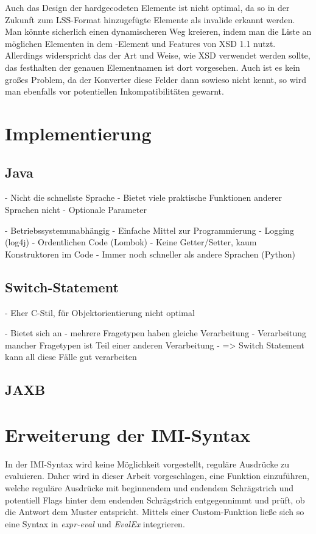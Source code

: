 Auch das Design der hardgecodeten Elemente ist nicht optimal, da so in der Zukunft zum LSS-Format hinzugefügte Elemente als invalide erkannt werden.
Man könnte sicherlich einen dynamischeren Weg kreieren, indem man die Liste an möglichen Elementen in dem -Element und Features von XSD 1.1 nutzt.
Allerdings widerspricht das der Art und Weise, wie XSD verwendet werden sollte, das festhalten der genauen Elementnamen ist dort vorgesehen.
Auch ist es kein großes Problem, da der Konverter diese Felder dann sowieso nicht kennt, so wird man ebenfalls vor potentiellen Inkompatibilitäten gewarnt.

\section{Implementierung}

\subsection{Java}

- Nicht die schnellste Sprache
- Bietet viele praktische Funktionen anderer Sprachen nicht
	- Optionale Parameter

- Betriebssystemunabhängig
- Einfache Mittel zur Programmierung
	- Logging (log4j)
	- Ordentlichen Code (Lombok)
		- Keine Getter/Setter, kaum Konstruktoren im Code
- Immer noch schneller als andere Sprachen (Python)

\subsection{Switch-Statement}

- Eher C-Stil, für Objektorientierung nicht optimal

- Bietet sich an
	- mehrere Fragetypen haben gleiche Verarbeitung
	- Verarbeitung mancher Fragetypen ist Teil einer anderen Verarbeitung
- => Switch Statement kann all diese Fälle gut verarbeiten

\subsection{JAXB}

\section{Erweiterung der IMI-Syntax}
\label{d:imi}

In der IMI-Syntax wird keine Möglichkeit vorgestellt, reguläre Ausdrücke zu evaluieren. %
Daher wird in dieser Arbeit vorgeschlagen, eine Funktion  einzuführen, welche reguläre Ausdrücke mit beginnendem und endendem Schrägstrich und potentiell Flags hinter dem endenden Schrägstrich entgegennimmt und prüft, ob die Antwort dem Muster entspricht.
Mittels einer Custom-Funktion ließe sich so eine Syntax in \textit{expr-eval} und \textit{EvalEx} integrieren.

